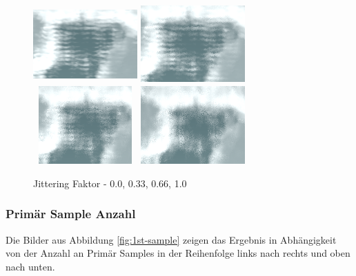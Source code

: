 \begin{figure}[H]
    \centering
    \includegraphics[width=4cm, height=3cm]{media/jittering_0.0.png}
    \includegraphics[width=4cm, height=3cm]{media/jittering_0.33.png}
    \includegraphics[width=4cm, height=3cm]{media/jittering_0.66.png}
    \includegraphics[width=4cm, height=3cm]{media/jittering_1.0.png}
    \caption{Jittering Faktor - 0.0, 0.33, 0.66, 1.0}
    \label{fig:jittering}
\end{figure}

\subsubsection{Primär Sample Anzahl}
Die Bilder aus Abbildung \ref{fig:1st-sample} zeigen das Ergebnis in Abhängigkeit von der Anzahl an Primär Samples in der Reihenfolge links nach rechts und oben nach unten.

